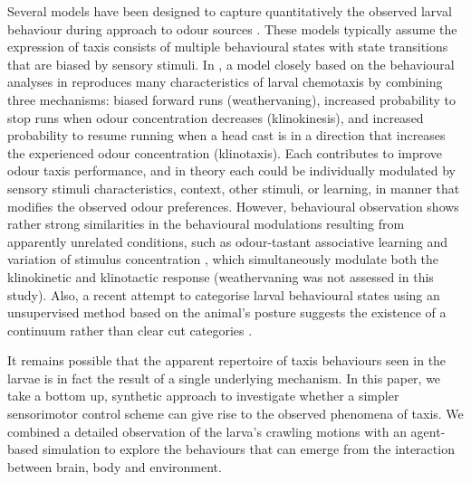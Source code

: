 \documentclass[11pt,a4paper]{article}
\newcommand{\todoBW}[1]{\todo[author=BW,color=orange, size=\tiny,inline]{#1}}
\begin{document}
Several models have been designed to capture quantitatively the observed larval behaviour during approach to odour sources  \citep{davies2015model,hernandez2015reverse,schleyer2015learning,gepner2015computations}. These models typically assume the expression of taxis consists of multiple behavioural states with state transitions that are biased by sensory stimuli. In \cite{davies2015model}, a model closely based on the behavioural analyses in
 \citet{lahiri2011two,gomez2014multilevel,gomez2011active} reproduces many characteristics of larval chemotaxis by combining three mechanisms: biased forward runs (weathervaning), increased probability to stop runs when odour concentration decreases (klinokinesis), and increased probability to resume running when a head cast is in a direction that increases the experienced odour concentration (klinotaxis). Each contributes to improve odour taxis performance, and in theory each could be individually modulated by sensory stimuli characteristics, context, other stimuli, or learning, in manner that modifies the observed odour preferences. 
However, behavioural observation shows rather strong similarities in the behavioural modulations resulting from apparently unrelated conditions, such as odour-tastant associative learning and variation of stimulus concentration \citep{schleyer2015learning}, which simultaneously modulate both the klinokinetic and klinotactic response (weathervaning was not assessed in this study). Also, a recent attempt to categorise larval behavioural states using an unsupervised method based on the animal's posture suggests the existence of a continuum rather than clear cut categories \citep{szigeti2015searching}.


It remains possible that the apparent repertoire of taxis behaviours seen in the larvae is in fact the result of a single underlying mechanism. In this paper, we take a bottom up, synthetic approach \citep{braitenberg1986vehicles} to investigate whether a simpler sensorimotor control scheme can give rise to the observed phenomena of taxis. We combined a detailed observation of the larva's crawling motions with an agent-based simulation to explore the behaviours that can emerge from the interaction between brain, body and environment.
\end{document}
